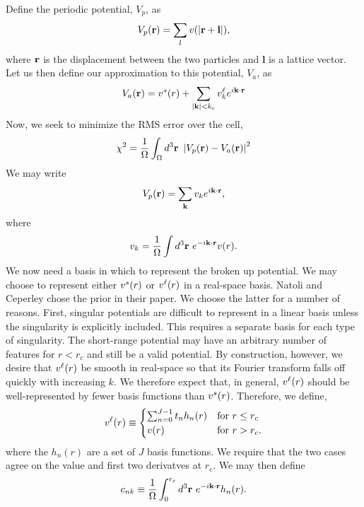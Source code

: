 \documentclass{article}
\begin{document}
Define the periodic potential, $V_p$, as 
\begin{equation}
V_p(\mathbf{r}) = \sum_l v(|\mathbf{r} + \mathbf{l}|),
\end{equation}
where $\mathbf{r}$ is the displacement between the two particles and
$\mathbf{l}$ is a lattice vector.  Let us then define our
approximation to this potential, $V_a$, as
\begin{equation}
V_a(\mathbf{r}) = v^s(r) + \sum_{|\mathbf{k}| < k_c} v^\ell_k e^{i\mathbf {\mathbf{k}} \cdot \mathbf{r}}
\end{equation}
Now, we seek to minimize the RMS error over the cell,
\begin{equation}
\chi^2 = \frac{1}{\Omega}\int_\Omega d^3 \mathbf{r} \ 
\left| V_p(\vr) - V_a(\vr)\right|^2 
\end{equation}
We may write
\begin{equation}
V_p(\mathbf{r}) = \sum_{\mathbf{k}} v_k e^{i \mathbf{k} \cdot \mathbf{r}},
\end{equation}
where 
\begin{equation}
v_k = \frac{1}{\Omega} \int d^3\mathbf{r} \ e^{-i\mathbf{k}\cdot\mathbf{r}}v(r).
\end{equation}
We now need a basis in which to represent the broken up potential.  We
may choose to represent either $v^s(r)$ or $v^\ell(r)$ in a real-space
basis.  Natoli and Ceperley chose the prior in their paper.  We choose
the latter for a number of reasons.  First, singular potentials are
difficult to represent in a linear basis unless the singularity is
explicitly included.  This requires a separate basis for each type of
singularity.  The short-range potential may have an arbitrary number
of features for $r<r_c$ and still be a valid potential.  By
construction, however, we desire that $v^\ell(r)$ be smooth in real-space
so that its Fourier transform falls off quickly with increasing $k$.
We therefore expect that, in general, $v^\ell(r)$ should be
well-represented by fewer basis functions than $v^s(r)$.  Therefore,
we define,
\begin{equation}
v^\ell(r) \equiv
\begin{cases}
 \sum_{n=0}^{J-1} t_n h_n(r) & \text{for } r \le r_c \\
 v(r) & \text{for } r > r_c.
\end{cases}
\end{equation}
where the $h_n(r)$ are a set of $J$ basis functions.  We require that
the two cases agree on the value and first two derivatves at $r_c$.
We may then define
\begin{equation}
c_{nk} \equiv \frac{1}{\Omega} \int_0^{r_c} d^3 \mathbf{r} \ e^{-i\mathbf{k}\cdot\mathbf{r}} h_n(r).
\end{equation}
\end{document}
